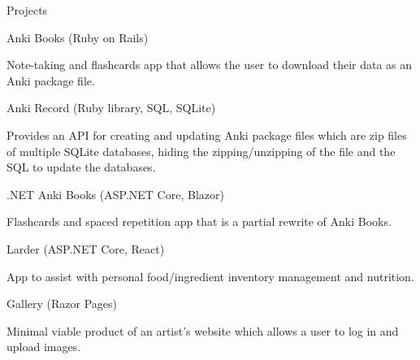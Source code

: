 \documentclass{resume}
\begin{document}
  \begin{rSection}{Projects}
    \begin{rSubsection}{Anki Books (Ruby on Rails)}{}{}{}
        \item Note-taking and flashcards app that allows the user to download their data as an Anki package file.
    \end{rSubsection}

    \begin{rSubsection}{Anki Record (Ruby library, SQL, SQLite)}{}{}{}
        \item Provides an API for creating and updating Anki package files which are zip files of multiple SQLite databases, hiding the zipping/unzipping of the file and the SQL to update the databases.
    \end{rSubsection}

    \begin{rSubsection}{.NET Anki Books (ASP.NET Core, Blazor)}{}{}{}
        \item Flashcards and spaced repetition app that is a partial rewrite of Anki Books. 
    \end{rSubsection}

    \begin{rSubsection}{Larder (ASP.NET Core, React)}{}{}{}
        \item App to assist with personal food/ingredient inventory management and nutrition.
    \end{rSubsection}

    \begin{rSubsection}{Gallery (Razor Pages)}{}{}{}
        \item Minimal viable product of an artist's website which allows a user to log in and upload images.
    \end{rSubsection}
    
        
  \end{rSection}

  
    
\end{document}
